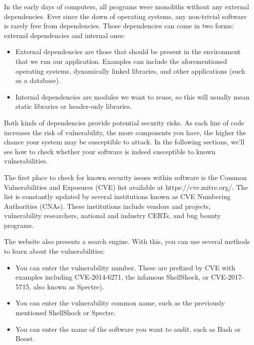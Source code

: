 
In the early days of computers, all programs were monoliths without any external dependencies. Ever since the dawn of operating systems, any non-trivial software is rarely free from dependencies. Those dependencies can come in two forms: external dependencies and internal ones:

\begin{itemize}
\item 
External dependencies are those that should be present in the environment that we run our application. Examples can include the aforementioned operating systems, dynamically linked libraries, and other applications (such as a database).

\item 
Internal dependencies are modules we want to reuse, so this will usually mean static libraries or header-only libraries.
\end{itemize}

Both kinds of dependencies provide potential security risks. As each line of code increases the risk of vulnerability, the more components you have, the higher the chance your system may be susceptible to attack. In the following sections, we'll see how to check whether your software is indeed susceptible to known vulnerabilities.


The first place to check for known security issues within software is the Common Vulnerabilities and Exposures (CVE) list available at https://cve.mitre.org/. The list is constantly updated by several institutions known as CVE Numbering Authorities (CNAs). These institutions include vendors and projects, vulnerability researchers, national and industry CERTs, and bug bounty programs. 

The website also presents a search engine. With this, you can use several methods to learn about the vulnerabilities:

\begin{itemize}
\item 
You can enter the vulnerability number. These are prefixed by CVE with examples including CVE-2014-6271, the infamous ShellShock, or CVE-2017-5715, also known as Spectre).

\item 
You can enter the vulnerability common name, such as the previously mentioned ShellShock or Spectre.

\item 
You can enter the name of the software you want to audit, such as Bash or Boost.
\end{itemize}

